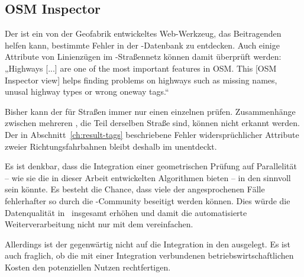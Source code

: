 \documentclass[../main/thesis.tex]{subfiles}
\begin{document}



\subsection{OSM Inspector}

Der  ist ein von der Geofabrik entwickeltes Web-Werkzeug, das Beitragenden helfen kann, bestimmte Fehler in der \osm-Datenbank zu entdecken.
Auch einige Attribute von Linienzügen im \osm-Straßennetz können damit überprüft werden:
„Highways [...] are one of the most important features in OSM.
This [OSM Inspector view] helps finding problems on highways such as missing names, unusal highway types or wrong oneway tags.“

Bisher kann der  für Straßen immer nur einen einzelnen  prüfen.
Zusammenhänge zwischen mehreren , die Teil derselben Straße sind, können nicht erkannt werden.
Der in Abschnitt~\ref{ch:result-tags} beschriebene Fehler widersprüchlicher Attribute zweier Richtungsfahrbahnen bleibt deshalb im  unentdeckt.

Es ist denkbar, dass die Integration einer geometrischen Prüfung auf Parallelität -- wie sie die in dieser Arbeit entwickelten Algorithmen bieten -- in den  sinnvoll sein könnte.
Es besteht die Chance, dass viele der angesprochenen Fälle fehlerhafter  so durch die \osm-Community beseitigt werden können.
Dies würde die Datenqualität in \osm\ insgesamt erhöhen und damit die automatisierte Weiterverarbeitung nicht nur mit dem  vereinfachen.

Allerdings ist der  gegenwärtig nicht auf die Integration in den  ausgelegt.
Es ist auch fraglich, ob die mit einer Integration verbundenen betriebswirtschaftlichen Kosten den potenziellen Nutzen rechtfertigen.
\end{document}
